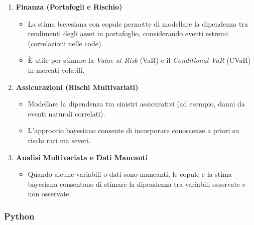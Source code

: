 \documentclass[%
	corpo=11pt,
    twoside,
    stile=classica,
    oldstyle,
    tipotesi=custom,
    greek,
    evenboxes,
]{toptesi}
\begin{document}
\begin{enumerate}
	\item \textbf{Finanza (Portafogli e Rischio)}
	\begin{itemize}
		\item La stima bayesiana con copule permette di modellare la dipendenza tra rendimenti degli asset in portafoglio, considerando eventi estremi (correlazioni nelle code).
		\item È utile per stimare la \textit{Value at Risk} (VaR) e il \textit{Conditional VaR} (CVaR) in mercati volatili.
	\end{itemize}
	
	\item \textbf{Assicurazioni (Rischi Multivariati)}
	\begin{itemize}
		\item Modellare la dipendenza tra sinistri assicurativi (ad esempio, danni da eventi naturali correlati).
		\item L’approccio bayesiano consente di incorporare conoscenze a priori su rischi rari ma severi.
	\end{itemize}
	
	\item \textbf{Analisi Multivariata e Dati Mancanti}
	\begin{itemize}
		\item Quando alcune variabili o dati sono mancanti, le copule e la stima bayesiana consentono di stimare la dipendenza tra variabili osservate e non osservate.
	\end{itemize}
\end{enumerate}

\subsubsection{Python}










\end{document}
